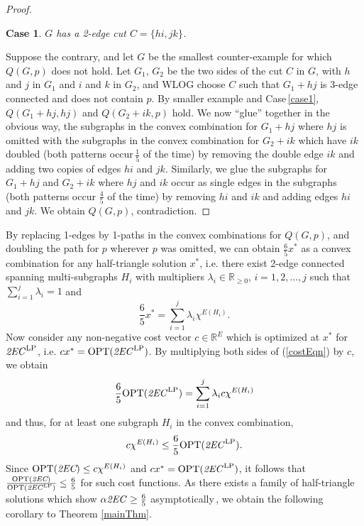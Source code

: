 \documentclass[oneeqnum,final]{siamltex1213}
\newcommand{\Real}{{\mathbb R}}
\newcommand{\TwoEC}{\emph{2EC}}
\newcommand{\TwoECLP}{\ensuremath{\text{\TwoEC}^{\text{LP}}}}
\newcommand{\alphaTwoEC}{\ensuremath{\alpha\text{\TwoEC}}}
\newtheorem{case}{Case}
\begin{document}
\begin{proof}
\begin{case}
$G$ has a 2-edge cut $C=\{hi, jk\}$.
\end{case}
Suppose the contrary, and let $G$ be the smallest counter-example for which $Q(G, p)$ does not hold. Let $G_{1}$, $G_{2}$ be the two sides of the cut $C$ in $G$, with $h$ and $j$ in $G_{1}$ and $i$ and $k$ in $G_{2}$, and WLOG choose $C$ such that $G_{1}+hj$ is 3-edge connected and does not contain $p$. By smaller example and Case\,\ref{case1}, $Q(G_{1}+hj, hj)$ and $Q(G_{2}+ik, p)$ hold. We now ``glue'' together in the obvious way, the subgraphs in the convex combination for $G_{1}+hj$ where $hj$ is omitted with the subgraphs in the convex combination for $G_{2}+ik$ which have $ik$ doubled (both patterns occur\,$\frac{1}{5}$ of the time) by removing the double edge $ik$ and adding two copies of edges $hi$ and $jk$. Similarly, we glue the subgraphs for $G_{1}+hj$ and $G_{2}+ik$ where $hj$ and $ik$ occur as single edges in the subgraphs (both patterns occur $\frac{4}{5}$ of the time) by removing $hi$ and $ik$ and adding edges $hi$ and $jk$. We obtain $Q(G, p)$, contradiction.
\end{proof}

By replacing 1-edges by 1-paths in the convex combinations for $Q(G, p)$, and doubling the path for $p$ wherever $p$ was omitted, we can obtain $\frac{6}{5}x^{*}$ as a convex combination for any half-triangle solution $x^{*}$, i.e. there exist \mbox{2-edge} connected spanning multi-subgraphs $H_{i}$ with multipliers $\lambda_{i}\in \Real_{\geq 0}$, $i=1, 2, \dotsc, j$ such that $\sum_{i=1}^{j}\lambda_{i}=1$ and 
\begin{equation} \label{costEqn}
\frac{6}{5}x^{*} = \sum_{i=1}^{j}\lambda_{i}\chi^{E(H_{i})} \text{.}
\end{equation}
Now consider any non-negative cost vector $c\in \Real^{E}$ which is optimized at $x^{*}$ for \TwoECLP{}, i.e. $cx^{*} = \text{OPT}(\TwoECLP{})$. By multiplying both sides of (\ref{costEqn}) by $c$, we obtain \[\frac{6}{5}\text{OPT}(\TwoECLP)=\sum_{i=1}^{j}\lambda_{i}c\chi^{E(H_{i})}\] and thus, for at least one subgraph $H_{i}$ in the convex combination,
\begin{equation} \label{resultEqn}
c\chi^{E(H_{i})} \leq\frac{6}{5}\text{OPT}(\TwoECLP{}) \text{.}
\end{equation}
Since $\text{OPT}(\TwoEC{})\leq c\chi^{E(H_{i})}$ and $cx^{*}=\text{OPT}(\TwoECLP)$, it follows that $\frac{\text{OPT}(\TwoEC)}{\text{OPT}(\TwoECLP)}\le \frac{6}{5}$ for such cost functions. As there exists a family of half-triangle solutions which show $\alphaTwoEC \geq \frac{6}{5}$ asymptotically\,\cite{alexander}, we obtain the following corollary to Theorem \ref{mainThm}.
\end{document}

